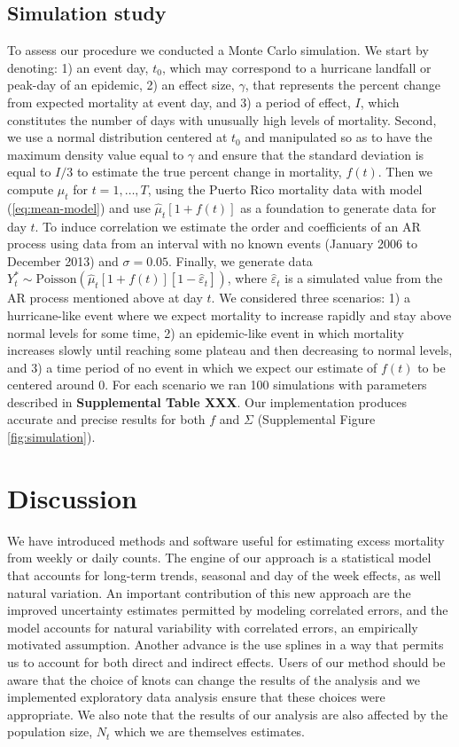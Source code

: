 \documentclass[11pt]{article}
\begin{document}
\subsection{Simulation study}
To assess our procedure we conducted a Monte Carlo simulation. We start by denoting: 1) an event day, $t_0$, which may correspond to a hurricane landfall or peak-day of an epidemic, 2) an effect size, $\gamma$, that represents the percent change from expected mortality at event day, and 3) a period of effect, $I$, which constitutes the number of days with unusually high levels of mortality. Second, we use a normal distribution centered at $t_0$ and manipulated so as to have the maximum density value equal to $\gamma$ and ensure that the standard deviation is equal to $I/3$ to estimate the true percent change in mortality, $f(t)$. Then we compute $\hat{\mu}_t$ for $t=1,\ldots, T$, using the Puerto Rico mortality data with model (\ref{eq:mean-model}) and use $\hat{\mu}_t\left[1+f(t)\right]$ as a foundation to generate data for day $t$. To induce correlation we estimate the order and coefficients of an AR process using data from an interval with no known events (January 2006 to December 2013) and $\sigma = 0.05$. Finally, we generate data $Y_t^* \sim \mbox{Poisson}\left(\hat{\mu}_t[1+f(t)][1 - \hat{\varepsilon}_t]\right)$, where $\hat{\varepsilon}_t$ is a simulated value from the AR process mentioned above at day $t$. We considered three scenarios: 1) a hurricane-like event where we expect mortality to increase rapidly and stay above normal levels for some time, 2) an epidemic-like event in which mortality increases slowly until reaching some plateau and then decreasing to normal levels, and 3) a time period of no event in which we expect our estimate of $f(t)$ to be centered around 0. For each scenario we ran 100 simulations with parameters described in \textbf{Supplemental Table XXX}. Our implementation produces accurate and precise results for both $f$ and $\Sigma$ (Supplemental Figure \ref{fig:simulation}).

\section{Discussion}
We have introduced methods and software useful for estimating excess mortality from weekly or daily counts. The engine of our approach is a statistical model that accounts for long-term trends, seasonal and day of the week effects, as well natural variation. An important contribution of this new approach are the improved uncertainty estimates permitted by modeling correlated errors, and 
the model accounts for natural variability with correlated errors, an empirically motivated assumption. Another advance is the use splines in a way that permits us to account for both direct and indirect effects. Users of our method should be aware that the choice of knots can change the results of the analysis and we implemented exploratory data analysis ensure that these choices were appropriate. We also note that the results of our analysis are also affected by the population size, $N_t$ which we are themselves estimates. 
\end{document}
